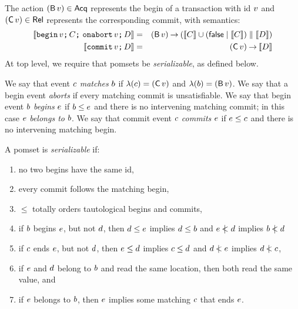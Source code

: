 The action $(\DB{\aVal})\in\Acq$ represents the begin of a transaction with
id $v$ and $(\DC{\aVal})\in \Rel$ represents the corresponding commit,
with semantics:
\begin{eqnarray*}
  \sem{\BEGINVAL\SEMI \aCmd\SEMI \RECOVERYVAL\SEMI \bCmd}
  & = &
  (\DB{\aVal}) \prefix (\sem{\aCmd} \cup (\FALSE \mid \sem{\aCmd}) \parallel \sem{\bCmd})
  \\
  \sem{\COMMITVAL\SEMI \bCmd}
  & = &
  (\DC{\aVal}) \prefix \sem{\bCmd}
\end{eqnarray*}
At top level, we require that pomsets be \emph{serializable}, as defined below.
\begin{definition}
  We say that event $c$ \emph{matches} $b$ if
  $\labelling(\comEv)=(\DC{\aVal})$ and
  $\labelling(\begEv)=(\DB{\aVal})$. %
  We say that a begin event \emph{aborts} if every matching commit is
  unsatisfiable.  We say that begin event $b$ \emph{begins} $e$ if
  $b\le e$ and there is no intervening matching commit; in this case
  $e$ \emph{belongs to} $b$.
  We say that commit event $c$ \emph{commits} $e$ if $e\le c$
  and there is no intervening matching begin.
\end{definition}
\begin{definition}
  A pomset is \emph{serializable} if:
  \begin{enumerate}
  \item\label{tx:1} no two begins have the same id,
  \item\label{tx:2} every commit follows the matching begin,
  \item\label{tx:3} $\le$ totally orders tautological begins and commits,
  \item\label{tx:4} if $b$ begins $e$, but not $d$, then
    $d\le e$ implies $d\le b$ and $e\mathrel{\,\mid\!\!\!<}d$ implies $b\mathrel{\,\mid\!\!\!<}d$
  \item\label{tx:5} if $c$ ends $e$, but not $d$, then
    $e\le d$ implies $c\le d$ and $d\mathrel{\,\mid\!\!\!<}e$ implies $d\mathrel{\,\mid\!\!\!<}c$,
  \item\label{tx:6} if $e$ and $d$ belong to $b$ and read the same
    location, then both read the same value, and 
  \item\label{tx:7} if $e$ belongs to $b$, then $e$ implies some
    matching $c$ that ends $e$.
  \end{enumerate}
\end{definition}
